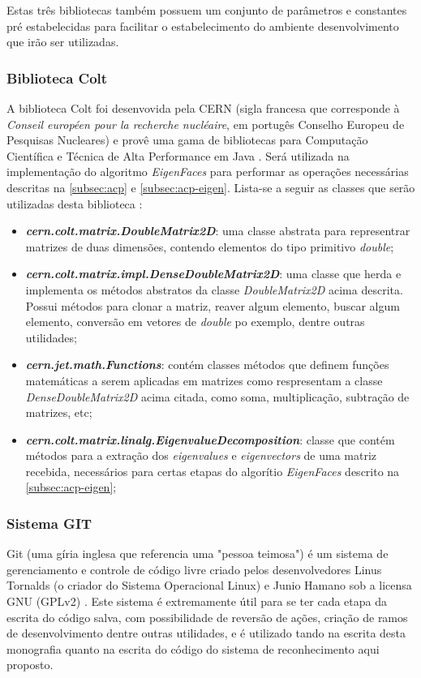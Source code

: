 Estas três bibliotecas também possuem um conjunto de parâmetros e constantes pré estabelecidas para facilitar o estabelecimento do ambiente desenvolvimento que irão ser utilizadas.

\subsubsection{Biblioteca Colt}\label{subsec:bib_colt}
A biblioteca Colt foi desenvovida pela CERN (sigla francesa que corresponde à \textit{Conseil européen pour la recherche nucléaire}, em portugês Conselho Europeu de Pesquisas Nucleares) e provê uma gama de bibliotecas para Computação Científica e Técnica de Alta Performance em Java \cite{colt}. Será utilizada na implementação do algoritmo \textit{EigenFaces} para performar as operações necessárias descritas na \autoref{subsec:acp} e \autoref{subsec:acp-eigen}. Lista-se a seguir as classes que serão utilizadas desta biblioteca \cite{colt}:


\begin{itemize}
	\item \textbf{\textit{cern.colt.matrix.DoubleMatrix2D}}: uma classe abstrata para representrar matrizes de duas dimensões, contendo elementos do tipo primitivo \textit{double};
	
	\item \textbf{\textit{cern.colt.matrix.impl.DenseDoubleMatrix2D}}: uma classe que herda e implementa os métodos abstratos da classe \textit{DoubleMatrix2D} acima descrita. Possui métodos para clonar a matriz, reaver algum elemento, buscar algum elemento, conversão em vetores de \textit{double} po exemplo, dentre outras utilidades;
			
	\item \textbf{\textit{cern.jet.math.Functions}}:  contém classes métodos que definem funções matemáticas a serem aplicadas em matrizes como respresentam a classe \textit{DenseDoubleMatrix2D} acima citada, como soma, multiplicação, subtração de matrizes, etc;
	
	\item \textbf{\textit{cern.colt.matrix.linalg.EigenvalueDecomposition}}: classe que contém métodos para a extração dos \textit{eigenvalues} e \textit{eigenvectors} de uma matriz recebida, necessários para certas etapas do algorítio \textit{EigenFaces} descrito na \autoref{subsec:acp-eigen};
\end{itemize}		


\subsubsection{Sistema GIT}\label{subsec:git}
Git (uma gíria inglesa que referencia uma "pessoa teimosa") é um sistema de gerenciamento e controle de código livre criado pelos desenvolvedores Linus Tornalds (o criador do Sistema Operacional Linux) e Junio Hamano sob a licensa GNU (GPLv2) \cite{git}. Este sistema é extremamente útil para se ter cada etapa da escrita do código salva, com possibilidade de reversão de ações, criação de ramos de desenvolvimento dentre outras utilidades, e é utilizado tando na escrita desta monografia quanto na escrita do código do sistema de reconhecimento aqui proposto.

